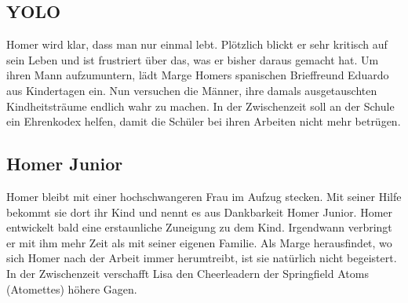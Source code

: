 \subsection{YOLO}
Homer wird klar, dass man nur einmal lebt. Plötzlich blickt er sehr kritisch auf sein Leben und ist frustriert über das, was er bisher daraus gemacht hat. Um ihren Mann aufzumuntern, lädt Marge Homers spanischen Brieffreund Eduardo aus Kindertagen ein. Nun versuchen die Männer, ihre damals ausgetauschten Kindheitsträume endlich wahr zu machen. In der Zwischenzeit soll an der Schule ein Ehrenkodex helfen, damit die Schüler bei ihren Arbeiten nicht mehr betrügen.


\subsection{Homer Junior}
Homer bleibt mit einer hochschwangeren Frau im Aufzug stecken. Mit seiner Hilfe bekommt sie dort ihr Kind und nennt es aus Dankbarkeit Homer Junior. Homer entwickelt bald eine erstaunliche Zuneigung zu dem Kind. Irgendwann verbringt er mit ihm mehr Zeit als mit seiner eigenen Familie. Als Marge herausfindet, wo sich Homer nach der Arbeit immer herumtreibt, ist sie natürlich nicht begeistert. In der Zwischenzeit verschafft Lisa den Cheerleadern der Springfield Atoms (Atomettes) höhere Gagen.


